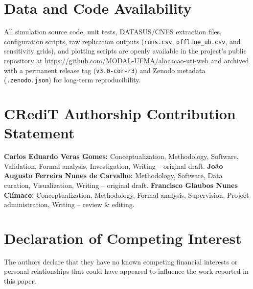 \documentclass[final,5p,times,twocolumn]{elsarticle}
\begin{document}
\section*{Data and Code Availability}
All simulation source code, unit tests, DATASUS/CNES extraction files, configuration scripts, raw replication outputs (\texttt{runs.csv}, \texttt{offline\_ub.csv}, and sensitivity grids), and plotting scripts are openly available in the project's public repository at \url{https://github.com/MODAL-UFMA/alocacao-uti-web} and archived with a permanent release tag (\texttt{v3.0-cor-r3}) and Zenodo metadata (\texttt{.zenodo.json}) for long-term reproducibility.

\section*{CRediT Authorship Contribution Statement}
\textbf{Carlos Eduardo Veras Gomes:} Conceptualization, Methodology, Software, Validation, Formal analysis, Investigation, Writing -- original draft. \textbf{Jo\~ao Augusto Ferreira Nunes de Carvalho:} Methodology, Software, Data curation, Visualization, Writing -- original draft. \textbf{Francisco Glaubos Nunes Cl\'imaco:} Conceptualization, Methodology, Formal analysis, Supervision, Project administration, Writing -- review \& editing.

\section*{Declaration of Competing Interest}
The authors declare that they have no known competing financial interests or personal relationships that could have appeared to influence the work reported in this paper.



\end{document}
